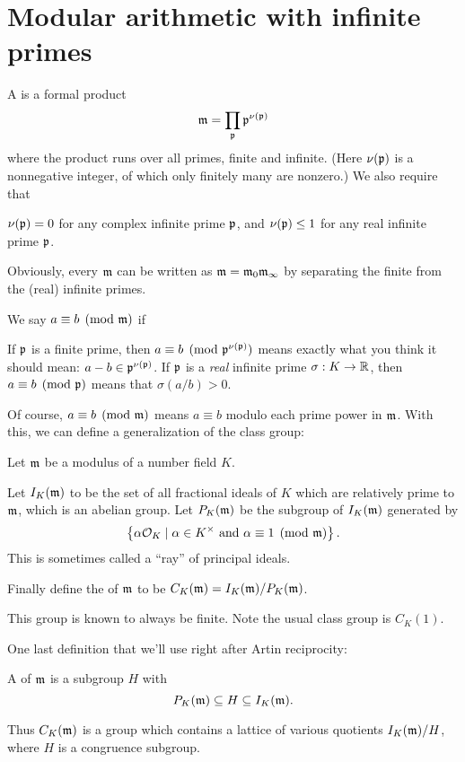 \section{Modular arithmetic with infinite primes}
A  is a formal product
\[ \mathfrak m = \prod_{\mathfrak p} \mathfrak p^{\nu(\mathfrak p)} \]
where the product runs over all primes, finite and infinite.
(Here $\nu(\mathfrak p)$ is a nonnegative integer,
of which only finitely many are nonzero.)
We also require that
\begin{itemize}
	\ii $\nu(\mathfrak p) = 0$ for any complex infinite prime $\mathfrak p$, and
	\ii $\nu(\mathfrak p) \le 1$ for any real infinite prime $\mathfrak p$.
\end{itemize}
Obviously, every $\mathfrak m$ can be written as $\mathfrak m = \mathfrak m_0\mathfrak m_\infty$
by separating the finite from the (real) infinite primes.

We say $a \equiv b \pmod{\mathfrak m}$ if
\begin{itemize}
	\ii If $\mathfrak p$ is a finite prime, then $a \equiv b \pmod{\mathfrak p^{\nu(\mathfrak p)}}$
	means exactly what you think it should mean:
	$a-b \in \mathfrak p^{\nu(\mathfrak p)}$.
	\ii If $\mathfrak p$ is a \emph{real} infinite prime $\sigma : K \to \mathbb R$, then
	$a \equiv b \pmod{\mathfrak p}$ means that $\sigma(a/b) > 0$.
\end{itemize}
Of course, $a \equiv b \pmod{\mathfrak m}$ means $a \equiv b$
modulo each prime power in $\mathfrak m$.
With this, we can define a generalization of the class group:
\begin{definition}
	Let $\mathfrak m$ be a modulus of a number field $K$.
	\begin{itemize}
		\ii Let $I_K(\mathfrak m)$ to be the set of all fractional ideals of $K$
		which are relatively prime to $\mathfrak m$, which is an abelian group.
		\ii Let $P_K(\mathfrak m)$ be the subgroup of $I_K(\mathfrak m)$ generated by
		\[
			\left\{
				\alpha \mathcal O_K
				\mid 
				\alpha \in K^\times \text{ and }
				\alpha \equiv 1 \pmod{\mathfrak m}
			\right\}.
		\]
		This is sometimes called a ``ray'' of principal ideals.
	\end{itemize}
	Finally define the  of $\mathfrak m$
	to be $C_K(\mathfrak m) = I_K(\mathfrak m) / P_K(\mathfrak m)$.
\end{definition}
This group is known to always be finite.
Note the usual class group is $C_K(1)$.

One last definition that we'll use right after Artin reciprocity:
\begin{definition}
	A  of $\mathfrak m$ is a subgroup $H$ with
	\[ P_K(\mathfrak m) \subseteq H \subseteq I_K(\mathfrak m). \]
\end{definition}
Thus $C_K(\mathfrak m)$ is a group which contains a lattice of various
quotients $I_K(\mathfrak m) / H$, where $H$ is a congruence subgroup.

